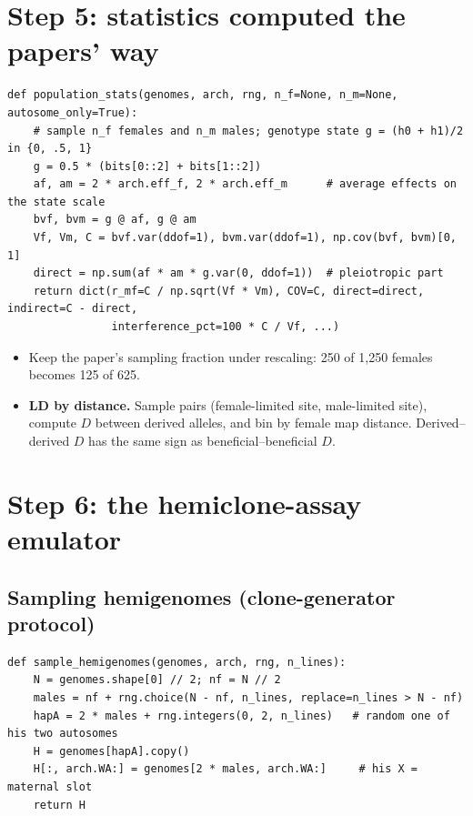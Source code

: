 \section{Step 5: statistics computed the papers' way}
\begin{lstlisting}
def population_stats(genomes, arch, rng, n_f=None, n_m=None, autosome_only=True):
    # sample n_f females and n_m males; genotype state g = (h0 + h1)/2 in {0, .5, 1}
    g = 0.5 * (bits[0::2] + bits[1::2])
    af, am = 2 * arch.eff_f, 2 * arch.eff_m      # average effects on the state scale
    bvf, bvm = g @ af, g @ am
    Vf, Vm, C = bvf.var(ddof=1), bvm.var(ddof=1), np.cov(bvf, bvm)[0, 1]
    direct = np.sum(af * am * g.var(0, ddof=1))  # pleiotropic part
    return dict(r_mf=C / np.sqrt(Vf * Vm), COV=C, direct=direct, indirect=C - direct,
                interference_pct=100 * C / Vf, ...)
\end{lstlisting}
\begin{itemize}
\item Keep the paper's sampling fraction under rescaling: 250 of 1,250 females becomes 125 of 625.
\item \textbf{LD by distance.} Sample pairs (female-limited site, male-limited site), compute $D$ between derived alleles, and bin by female map distance. Derived--derived $D$ has the same sign as beneficial--beneficial $D$.
\end{itemize}

\section{Step 6: the hemiclone-assay emulator}
\subsection{Sampling hemigenomes (clone-generator protocol)}
\begin{lstlisting}
def sample_hemigenomes(genomes, arch, rng, n_lines):
    N = genomes.shape[0] // 2; nf = N // 2
    males = nf + rng.choice(N - nf, n_lines, replace=n_lines > N - nf)
    hapA = 2 * males + rng.integers(0, 2, n_lines)   # random one of his two autosomes
    H = genomes[hapA].copy()
    H[:, arch.WA:] = genomes[2 * males, arch.WA:]     # his X = maternal slot
    return H
\end{lstlisting}

